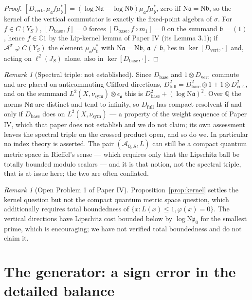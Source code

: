 \documentclass[11pt]{amsart}
\numberwithin{equation}{section}
\theoremstyle{definition}
\theoremstyle{remark}
\newtheorem{remark}[theorem]{Remark}
\newcommand{\Q}{\mathbb{Q}}
\newcommand{\C}{\mathbb{C}}
\newcommand{\cA}{\mathcal{A}}
\newcommand{\pp}{\mathfrak{p}}
\newcommand{\aaa}{\mathfrak{a}}
\newcommand{\bb}{\mathfrak{b}}
\newcommand{\Ns}{\mathrm{N}}
\newcommand{\Db}{D_{\mathrm{base}}}
\newcommand{\Dv}{D_{\mathrm{vert}}}
\newcommand{\Df}{D_{\mathrm{full}}}
\newcommand{\nusym}{\nu_{\mathrm{sym}}}
\begin{document}
\begin{proof}
$[\Dv,\mu_\aaa f\mu_\bb^*]=(\log\Ns\aaa-\log\Ns\bb)\mu_\aaa f\mu_\bb^*$, zero iff
$\Ns\aaa=\Ns\bb$, so the kernel of the vertical commutator is exactly the fixed-point algebra
of $\sigma$. For $f\in C(Y_S)$, $[\Db,f]=0$ forces $[\Db,f\circ m_1]=0$ on the summand
$\bb=(1)$, hence $f\in\C1$ by the Lip-kernel lemma of Paper IV (its Lemma 3.1); if
$\cA^\sigma\supsetneq C(Y_S)$ the element $\mu_\aaa\mu_\bb^*$ with $\Ns\aaa=\Ns\bb$,
$\aaa\ne\bb$, lies in $\ker[\Dv,\cdot]$ and, acting on $\ell^2(J_S)$ alone, also in
$\ker[\Db,\cdot]$.
\end{proof}

\begin{remark}[Spectral triple: not established]\label{rem:notriple}
Since $\Db$ and $1\otimes\Dv$ commute and are placed on anticommuting Clifford directions,
$\Df^2=\Db^2\otimes1+1\otimes\Dv^2$, and on the summand $L^2(X,\nusym)\otimes\epsilon_\aaa$
this is $\Db^2+(\log\Ns\aaa)^2$. Over $\Q$ the norms $\Ns\aaa$ are distinct and tend to
infinity, so $\Df$ has compact resolvent if and only if $\Db$ does on $L^2(X,\nusym)$ ---
a property of the weight sequence of Paper IV, which that paper does not establish and we do
not claim; its own assessment leaves the spectral triple on the crossed product open, and so
do we. In particular no index theory is asserted. The pair $(\cA_{\Q,S},L)$ can still be a
compact quantum metric space in Rieffel's sense \cite{Rieffel} --- which requires only that
the Lipschitz ball be totally bounded modulo scalars --- and it is that notion, not the
spectral triple, that is at issue here; the two are often conflated.
\end{remark}

\begin{remark}[Open Problem 1 of Paper IV]\label{rem:openone}
Proposition~\ref{prop:kernel} settles the kernel question but not the compact quantum metric
space question, which additionally requires total boundedness of
$\{x:L(x)\le1,\varphi(x)=0\}$. The vertical directions have Lipschitz cost bounded below by
$\log\Ns\pp_0$ for the smallest prime, which is encouraging; we have not verified total
boundedness and do not claim it.
\end{remark}

\section{The generator: a sign error in the detailed balance}
\end{document}

